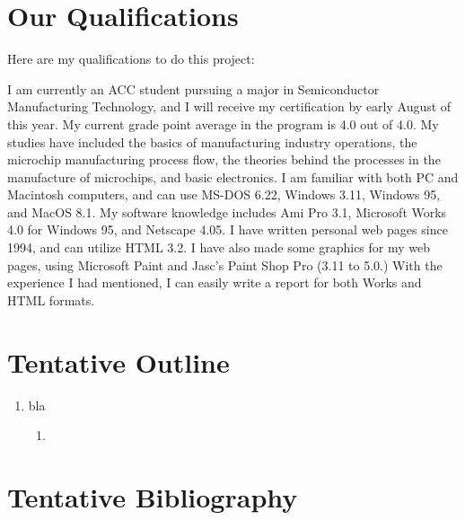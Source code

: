 \section*{Our Qualifications}
Here are my qualifications to do this project:

I am currently an ACC student pursuing a major in Semiconductor Manufacturing Technology, and I will receive my certification by early August of this year.
My current grade point average in the program is 4.0 out of 4.0. My studies have included the basics of manufacturing industry operations, the microchip manufacturing process flow, the theories behind the processes in the manufacture of microchips, and basic electronics.
I am familiar with both PC and Macintosh computers, and can use MS-DOS 6.22, Windows 3.11, Windows 95, and MacOS 8.1. My software knowledge includes Ami Pro 3.1, Microsoft Works 4.0 for Windows 95, and Netscape 4.05.
I have written personal web pages since 1994, and can utilize HTML 3.2. I have also made some graphics for my web pages, using Microsoft Paint and Jasc's Paint Shop Pro (3.11 to 5.0.)
With the experience I had mentioned, I can easily write a report for both Works and HTML formats.
\section*{Tentative Outline}
\begin{enumerate} [label=\Roman*.]
\item bla
\begin{enumerate} [label=\Alph*.]
\item 
\end{enumerate}
\end{enumerate}
\section*{Tentative Bibliography}
\printbibliography
